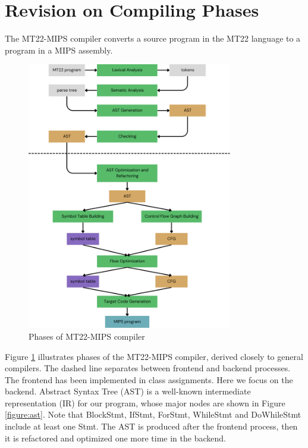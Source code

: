 \section{Revision on Compiling Phases}
The MT22-MIPS compiler converts a source program in the MT22 language to a program in a MIPS assembly.

\begin{figure}[ht]
    \centering
    \includegraphics[width=0.8\textwidth]{img/compiler-phases.png}
    \caption{Phases of MT22-MIPS compiler}
    \label{figure:compiler-phases}
\end{figure}

Figure \ref{figure:compiler-phases} illustrates phases of the MT22-MIPS compiler, derived closely to general compilers. The dashed line separates between frontend and backend processes. The frontend has been implemented in class assignments. Here we focus on the backend. Abstract Syntax Tree (AST) is a well-known intermediate representation (IR) for our program, whose major nodes are shown in Figure \ref{figure:ast}. Note that BlockStmt, IfStmt, ForStmt, WhileStmt and DoWhileStmt include at least one Stmt. The AST is produced after the frontend process, then it is refactored and optimized one more time in the backend.

